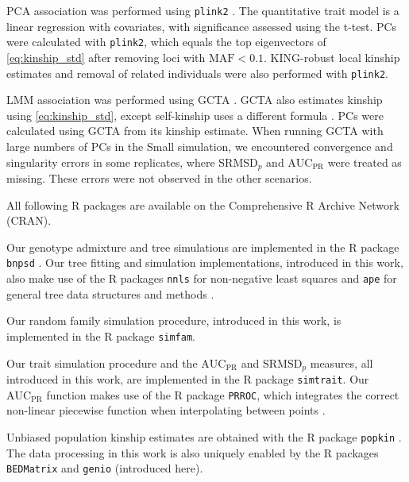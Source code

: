 \documentclass[11pt]{article}
\newcommand{\rmsd}{\text{SRMSD}_p}
\newcommand{\auc}{\text{AUC}_\text{PR}}
\begin{document}
PCA association was performed using \texttt{plink2} \citep{chang_second-generation_2015}.
The quantitative trait model is a linear regression with covariates, with significance assessed using the t-test.
PCs were calculated with \texttt{plink2}, which equals the top eigenvectors of \cref{eq:kinship_std} after removing loci with $\text{MAF} < 0.1$.
KING-robust local kinship estimates and removal of related individuals were also performed with \texttt{plink2}.

LMM association was performed using GCTA \citep{yang_gcta:_2011}.
GCTA also estimates kinship using \cref{eq:kinship_std}, except self-kinship uses a different formula \citep{yang_gcta:_2011}.
PCs were calculated using GCTA from its kinship estimate.
When running GCTA with large numbers of PCs in the Small simulation, we encountered convergence and singularity errors in some replicates, where $\rmsd$ and $\auc$ were treated as missing.
These errors were not observed in the other scenarios.

All following R packages are available on the Comprehensive R Archive Network (CRAN).

Our genotype admixture and tree simulations are implemented in the R package \texttt{bnpsd} \citep{ochoa_estimating_2021}.
Our tree fitting and simulation implementations, introduced in this work, also make use of the R packages \texttt{nnls} for non-negative least squares \citep{mullen_nnls_2012} and \texttt{ape} for general tree data structures and methods \citep{paradis_ape_2019}.

Our random family simulation procedure, introduced in this work, is implemented in the R package \texttt{simfam}.

Our trait simulation procedure and the $\auc$ and $\rmsd$ measures, all introduced in this work, are implemented in the R package \texttt{simtrait}.
Our $\auc$ function makes use of the R package \texttt{PRROC}, which integrates the correct non-linear piecewise function when interpolating between points \citep{grau_prroc:_2015}.

Unbiased population kinship estimates are obtained with the R package \texttt{popkin} \citep{ochoa_estimating_2021}.
The data processing in this work is also uniquely enabled by the R packages \texttt{BEDMatrix} \citep{grueneberg_bgdata_2019} and \texttt{genio} (introduced here).
\end{document}
